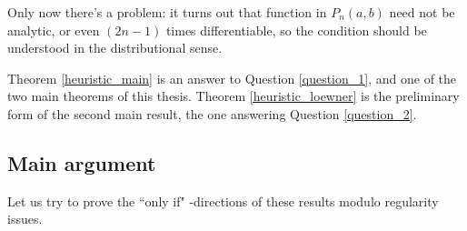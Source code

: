 Only now there's a problem: it turns out that function in $P_{n}(a, b)$ need not be analytic, or even $(2 n - 1)$ times differentiable, so the condition should be understood in the distributional sense.

Theorem \ref{heuristic_main} is an answer to Question \ref{question_1}, and one of the two main theorems of this thesis. Theorem \ref{heuristic_loewner} is the preliminary form of the second main result, the one answering Question \ref{question_2}.

\subsection{Main argument}

Let us try to prove the ``only if" -directions of these results modulo regularity issues.


